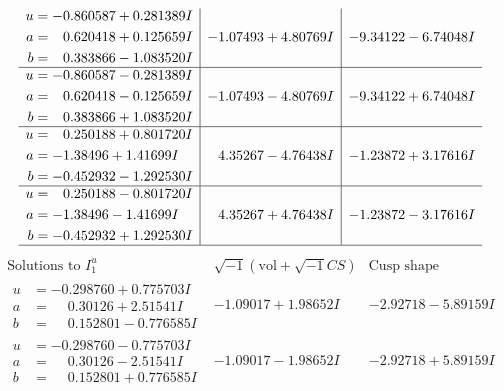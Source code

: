 \documentclass[1p]{elsarticle_modified}
\theoremstyle{definition}
\newcommand{\I}{\sqrt{-1}}
\begin{document}
$$\begin{array}{c|c|c}
\begin{aligned}
u &= -0.860587 + 0.281389 I \\
a &= \phantom{-}0.620418 + 0.125659 I \\
b &= \phantom{-}0.383866 - 1.083520 I\end{aligned}
 & -1.07493 + 4.80769 I & -9.34122 - 6.74048 I \\ \hline\begin{aligned}
u &= -0.860587 - 0.281389 I \\
a &= \phantom{-}0.620418 - 0.125659 I \\
b &= \phantom{-}0.383866 + 1.083520 I\end{aligned}
 & -1.07493 - 4.80769 I & -9.34122 + 6.74048 I \\ \hline\begin{aligned}
u &= \phantom{-}0.250188 + 0.801720 I \\
a &= -1.38496 + 1.41699 I \\
b &= -0.452932 - 1.292530 I\end{aligned}
 & \phantom{-}4.35267 - 4.76438 I & -1.23872 + 3.17616 I \\ \hline\begin{aligned}
u &= \phantom{-}0.250188 - 0.801720 I \\
a &= -1.38496 - 1.41699 I \\
b &= -0.452932 + 1.292530 I\end{aligned}
 & \phantom{-}4.35267 + 4.76438 I & -1.23872 - 3.17616 I\\
 \hline 
 \end{array}$$\newpage$$\begin{array}{c|c|c}  
\text{Solutions to }I^u_{1}& \I (\text{vol} + \sqrt{-1}CS) & \text{Cusp shape}\\
 \hline 
\begin{aligned}
u &= -0.298760 + 0.775703 I \\
a &= \phantom{-}0.30126 + 2.51541 I \\
b &= \phantom{-}0.152801 - 0.776585 I\end{aligned}
 & -1.09017 + 1.98652 I & -2.92718 - 5.89159 I \\ \hline\begin{aligned}
u &= -0.298760 - 0.775703 I \\
a &= \phantom{-}0.30126 - 2.51541 I \\
b &= \phantom{-}0.152801 + 0.776585 I\end{aligned}
 & -1.09017 - 1.98652 I & -2.92718 + 5.89159 I \\ \hline\begin{aligned}

\end{aligned}
\end{array}$$
\end{document}
